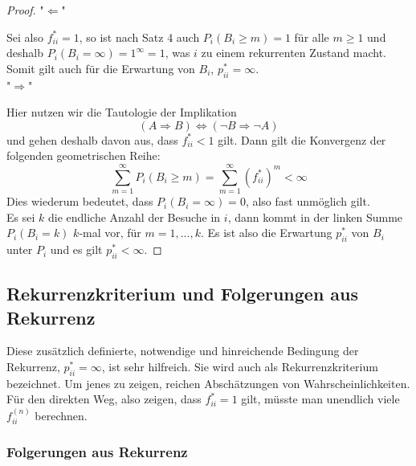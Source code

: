 \documentclass[a4paper]{article}
\begin{document}
\begin{proof}
	"$\Leftarrow$"

	Sei also $f_{ii} ^{*} =1$, so ist nach Satz 4 auch 
	$P_i \left(
		B_i \geq m
	\right) = 1$
	für alle $m \geq 1$ und deshalb 
	$P_i \left(
		B_i = \infty
	\right) = 1 ^{\infty} = 1$,
	was $i$ zu einem rekurrenten Zustand macht. 
	Somit gilt auch für die Erwartung von $B_i$, $p_{ii} ^{*} = \infty$.
	\\

	"$\Rightarrow$"

	Hier nutzen wir die Tautologie der Implikation 
	\[
	\left(
		A \Rightarrow B
	\right) \Leftrightarrow 
	\left(
		\neg B \Rightarrow \neg A
	\right) 
	\] 
	und gehen deshalb
	davon aus, dass $f_{ii} ^{*} < 1$ gilt. Dann gilt die Konvergenz der folgenden geometrischen Reihe:
	\[
	\sum_{m=1}^{\infty} P_i \left(
		B_i \geq m
	\right) = \sum_{m=1}^{\infty} \left(
		f_{ii} ^{*}
	\right) ^{m} < \infty
	\] 
	Dies wiederum bedeutet, dass $P_i (B_i = \infty) = 0$, also fast unmöglich gilt.
	\\

	Es sei $k$ die endliche Anzahl der Besuche in $i$, dann kommt in der linken Summe $P_i \left(
		B_i = k
	\right) $ $k$-mal
	vor, für $m=1,...,k$. Es ist also die Erwartung $p_{ii} ^{*}$ von $B_i$ unter $P_i$ und es gilt $p_{ii} ^{*} < \infty$.
\end{proof}

\subsection{Rekurrenzkriterium und Folgerungen aus Rekurrenz}
Diese zusätzlich definierte, notwendige und hinreichende Bedingung der Rekurrenz, $p_{ii} ^{*} = \infty$, ist
sehr hilfreich. Sie wird auch als Rekurrenzkriterium bezeichnet. 
Um jenes zu zeigen, reichen
Abschätzungen von Wahrscheinlichkeiten. 
\\

Für den direkten Weg, also zeigen, dass $f_{ii} ^{*} = 1$ gilt,
müsste man unendlich viele $f_{ii} ^{(n)}$ berechnen.

\subsubsection{Folgerungen aus Rekurrenz}
\end{document}
